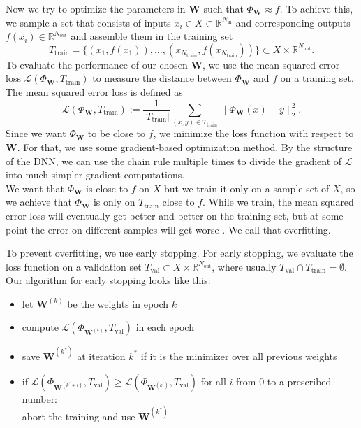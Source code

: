 Now we try to optimize the parameters in $\mathbf{W}$ such that $\Phi_\mathbf{W}\approx f$. To achieve this, we sample a set that consists of inputs $x_i\in X\subset\mathbb{R}^{N_{\mathrm{in}}}$ and corresponding outputs $f(x_i)\in\mathbb{R}^{N_{\mathrm{out}}}$ and assemble them in the training set
\begin{equation}
T_\mathrm{train}=\{(x_1,f(x_1)),\dotsc,(x_{N_\mathrm{train}},f(x_{N_\mathrm{train}}))\}\subset X\times\mathbb{R}^{N_\mathrm{out}}.
\end{equation}
To evaluate the performance of our chosen $\mathbf{W}$, we use the mean squared error loss $\mathscr{L}(\Phi_\mathbf{W},T_\mathrm{train})$ to measure the distance between $\Phi_\mathbf{W}$ and $f$ on a training set. The mean squared error loss is defined as
\begin{displaymath}
\mathscr{L}(\Phi_\mathbf{W},T_\mathrm{train}):=\frac{1}{|T_\mathrm{train}|}\sum_{(x,y)\in T_\mathrm{train}}\| \Phi_\mathbf{W}(x)-y\|_2^2.
\end{displaymath}
Since we want $\Phi_\mathbf{W}$ to be close to $f$, we minimize the loss function with respect to $\mathbf{W}$. For that, we use some gradient-based optimization method. By the structure of the DNN, we can use the chain rule multiple times to divide the gradient of $\mathscr{L}$ into much simpler gradient computations.\\

We want that $\Phi_\mathbf{W}$ is close to $f$ on $X$ but we train it only on a sample set of $X$, so we achieve that $\Phi_\mathbf{W}$ is only on $T_\mathrm{train}$ close to $f$. While we train, the mean squared error loss will eventually get better and better on the training set, but at some point the error on different samples will get worse \cite{Prechelt2012}. We call that overfitting.

To prevent overfitting, we use early stopping. For early stopping, we evaluate the loss function on a validation set $T_\mathrm{val}\subset X\times\mathbb{R}^{N_\mathrm{out}}$, where usually $T_\mathrm{val}\cap T_\mathrm{train}=\emptyset$. Our algorithm for early stopping looks like this:

\begin{itemize}
\item let $\mathbf{W}^{(k)}$ be the weights in epoch $k$%
\item compute $\mathscr{L}(\Phi_{\mathbf{W}^{(k)}},T_\mathrm{val})$ in each epoch
\item save $\mathbf{W}^{(k^*)}$ at iteration $k^*$ if it is the minimizer over all previous weights
\item if $\mathscr{L}(\Phi_{\mathbf{W}^{(k^*+i)}},T_\mathrm{val})\geq\mathscr{L}(\Phi_{\mathbf{W}^{(k^*)}},T_\mathrm{val})$ for all $i$ from $0$ to a prescribed number:\\
abort the training and use $\mathbf{W}^{(k^*)}$
\end{itemize}

